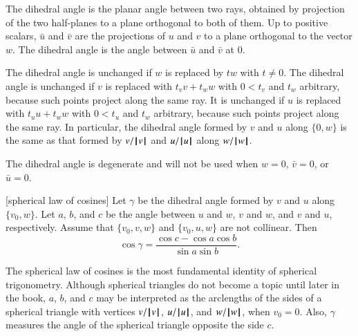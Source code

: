 The dihedral angle is the planar angle between two rays, obtained by projection of the two half-planes to a plane orthogonal to both of them.
Up to positive scalars, $\bar u$ and $\bar v$ are the projections of
$u$ and $v$ to a plane orthogonal to the vector $w$.  The
dihedral angle is the angle between $\bar u$ and $\bar v$ at $0$.

The dihedral angle is unchanged if $w$ is replaced by $t w$ with
$t\ne0$. The dihedral angle is unchanged if $v$ is replaced with
$t_v v + t_w w$ with $0 < t_v$ and $t_w$ arbitrary, because such points project along the same ray.  
It is unchanged if
$u$ is replaced with $t_u u + t_w w$ with $0 < t_u$ and $t_w$
arbitrary, because such points project along the same ray.  In particular, the dihedral angle formed by $v$ and
$u$ along $\{0,w\}$ is the same as that formed by $v/{{\hskip0.1em|\hskip-0.15em|\hskip0.1em}v{\hskip0.1em|\hskip-0.15em|\hskip0.1em}}$ and
$u/{{\hskip0.1em|\hskip-0.15em|\hskip0.1em}u{\hskip0.1em|\hskip-0.15em|\hskip0.1em}}$ along $w/{{\hskip0.1em|\hskip-0.15em|\hskip0.1em}w{\hskip0.1em|\hskip-0.15em|\hskip0.1em}}$.

The dihedral angle is degenerate and will not be used when $w =
0$, $\bar v = 0$, or $\bar u = 0$.




\begin{lemma}[spherical law of cosines]\label{lemma:sloc}
Let $\gamma$ be the dihedral angle formed by $v$ and $u$ along
$\{v_0,w\}$.  Let $a$, $b$, and $c$ be the
angle between $u$ and $w$, $v$ and $w$, and $v$ and
$u$, respectively. %
Assume that $\{v_0,v,w\}$ and $\{v_0,u,w\}$ are not collinear.
Then
    $$\cos\gamma = \frac{\cos c - \cos a \cos b}{\sin a\sin b}.$$
\end{lemma}

The spherical law of cosines is the most fundamental identity of spherical trigonometry.    Although  spherical
triangles do not become a topic until later in the book, $a$, $b$, and $c$ may be interpreted as
the arclengths of the sides of a spherical triangle with
vertices $v/{{\hskip0.1em|\hskip-0.15em|\hskip0.1em}v{\hskip0.1em|\hskip-0.15em|\hskip0.1em}}$, $u/{{\hskip0.1em|\hskip-0.15em|\hskip0.1em}u{\hskip0.1em|\hskip-0.15em|\hskip0.1em}}$, and $w/{{\hskip0.1em|\hskip-0.15em|\hskip0.1em}w{\hskip0.1em|\hskip-0.15em|\hskip0.1em}}$,  when $v_0=0$.  Also,
$\gamma$ measures the angle of the spherical triangle opposite the
side $c$.


